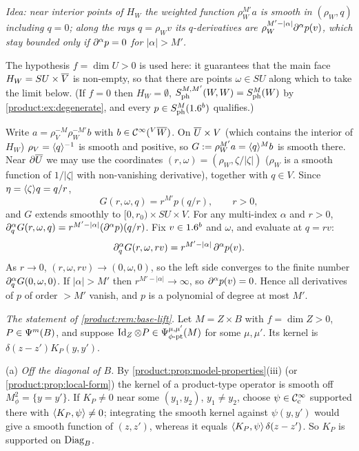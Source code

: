 \subsection*{}
\emph{Idea: near interior points of $H_W$ the weighted function $\rho_W^{M'}a$ is
smooth in $(\rho_W,q)$ including $q=0$; along the rays $q=\rho_Wv$ its
$q$-derivatives are $\rho_W^{M'-|\alpha|}\partial^\alpha p(v)$, which stay bounded only if
$\partial^\alpha p=0$ for $|\alpha|>M'$.}

The hypothesis $f=\dim U>0$ is used here: it guarantees that the main face
$H_W=SU\times\overline{V}$ is non-empty, so that there are points $\omega\in SU$ along which
to take the limit below. (If $f=0$ then $H_W=\emptyset$,
$S^{M,M'}_{\mathrm{ph}}(W,W)=S^{M}_{\mathrm{ph}}(W)$ by \cref{product:ex:degenerate}, and every
$p\in S^{M}_{\mathrm{ph}}(1.6^b)$ qualifies.)

Write $a=\rho_V^{-M}\rho_W^{-M'}b$ with $b\in\mathcal{C}^\infty({}^{V}\overline{W})$. On $\overline{U}\times V$
(which contains the interior of $H_W$) $\rho_V=\langle q\rangle^{-1}$ is smooth and positive, so
$G:=\rho_W^{M'}a=\langle q\rangle^Mb$ is smooth there. Near $\partial\overline{U}$ we may use the
coordinates $(r,\omega)=(\rho_W,\zeta/|\zeta|)$ ($\rho_W$ is a smooth function of
$1/|\zeta|$ with non-vanishing derivative), together with $q\in V$. Since
$\eta=\langle \zeta\rangle q=q/r$,
\begin{equation*}
G(r,\omega,q)=r^{M'}p(q/r),\qquad r>0,
\end{equation*}
and $G$ extends smoothly to $[0,r_0)\times SU\times V$. For any multi-index $\alpha$
and $r>0$, $\partial_q^\alpha G(r,\omega,q)=r^{M'-|\alpha|}(\partial^\alpha p)(q/r)$. Fix
$v\in1.6^b$ and $\omega$, and evaluate at $q=rv$:
\begin{equation*}
\partial_q^\alpha G(r,\omega,rv)=r^{M'-|\alpha|}\,\partial^\alpha p(v).
\end{equation*}
As $r\to0$, $(r,\omega,rv)\to(0,\omega,0)$, so the left side converges to the finite
number $\partial^\alpha_qG(0,\omega,0)$. If $|\alpha|>M'$ then $r^{M'-|\alpha|}\to\infty$, so
$\partial^\alpha p(v)=0$. Hence all derivatives of $p$ of order $>M'$ vanish, and $p$ is a
polynomial of degree at most $M'$.

\emph{The statement of \cref{product:rem:base-lift}.} Let $M=Z\times B$ with
$f=\dim Z>0$, $P\in\Psi^{m}(B)$, and suppose $\operatorname{Id}_Z\otimes P\in\Psi^{\mu,\mu'}_{\phi\text{-}\mathrm{pt}}(M)$ for some
$\mu,\mu'$. Its kernel is $\delta(z-z')K_P(y,y')$.

(a) \emph{Off the diagonal of $B$.} By \cref{product:prop:model-properties}(iii) (or
\cref{product:prop:local-form}) the kernel of a product-type operator is smooth off
$M^2_\phi=\{y=y'\}$. If $K_P\neq0$ near some $(y_1,y_2)$, $y_1\neq y_2$, choose
$\psi\in\mathcal{C}^\infty_{\mathrm{c}}$ supported there with $\langle K_P, \psi\rangle\neq0$; integrating the smooth
kernel against $\psi(y,y')$ would give a smooth function of $(z,z')$, whereas it equals
$\langle K_P, \psi\rangle\,\delta(z-z')$. So $K_P$ is supported on $\operatorname{Diag}_B$.

